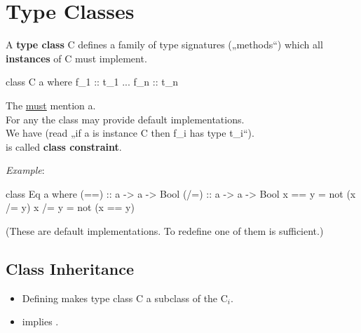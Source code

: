 

\chapter{Type Classes} %
\label{cha:type_classes}

A \textbf{type class} C defines a family of type signatures („methods“) which all \textbf{instances} of C must implement.

\begin{codebox}[haskell]
class C a where
    f_1 :: t_1
    ...
    f_n :: t_n
\end{codebox}
The  \underline{must} mention a.\\
For any  the class may provide default implementations. \\
We have  (read „if a is instance C then f\_i has type t\_i“).\\
 is called \textbf{class constraint}.

\textit{Example}:

\begin{codebox}[haskell]
class Eq a where
    (==) :: a -> a -> Bool
    (/=) :: a -> a -> Bool
    x == y = not (x /= y)
    x /= y = not (x == y)
\end{codebox}
(These are default implementations. To redefine one of them is sufficient.)



\section{Class Inheritance}

\begin{itemize}
    \item Defining  makes type class C a subclass of the C$_i$.\\
    \item {} implies .
\end{itemize}

\vspace{9pt}
\vspace{9pt}


